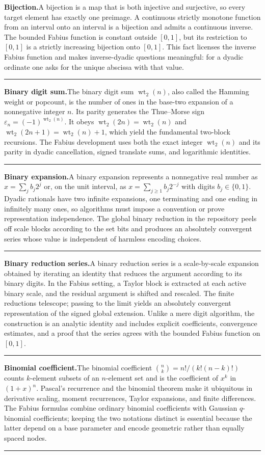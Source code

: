 \documentclass[11pt,oneside]{article}
\newcommand{\wt}{\operatorname{wt}_2}
\newcommand{\glossaryentry}[3]{%
  \par\addvspace{0.95\baselineskip}%
  \phantomsection\hypertarget{gls:#1}{}%
  \noindent\textbf{\large #2.}\enspace #3\par
  \nopagebreak[2]\vspace{0.15\baselineskip}%
  \noindent\color{rulegray}\rule{\linewidth}{0.25pt}\color{black}%
}
\begin{document}
\glossaryentry{bijection}{Bijection}{A bijection is a map that is both injective and surjective, so every target element has exactly one preimage. A continuous strictly monotone function from an interval onto an interval is a bijection and admits a continuous inverse. The bounded Fabius function is constant outside \([0,1]\), but its restriction to \([0,1]\) is a strictly increasing bijection onto \([0,1]\). This fact licenses the inverse Fabius function and makes inverse-dyadic questions meaningful: for a dyadic ordinate one asks for the unique abscissa with that value.}
\glossaryentry{binary-digit-sum}{Binary digit sum}{The binary digit sum \(\wt(n)\), also called the Hamming weight or popcount, is the number of ones in the base-two expansion of a nonnegative integer \(n\). Its parity generates the Thue--Morse sign \(\varepsilon_n=(-1)^{\wt(n)}\). It obeys \(\wt(2n)=\wt(n)\) and \(\wt(2n+1)=\wt(n)+1\), which yield the fundamental two-block recursions. The Fabius development uses both the exact integer \(\wt(n)\) and its parity in dyadic cancellation, signed translate sums, and logarithmic identities.}
\glossaryentry{binary-expansion}{Binary expansion}{A binary expansion represents a nonnegative real number as \(x=\sum_{j}b_j2^j\) or, on the unit interval, as \(x=\sum_{j\ge1}b_j2^{-j}\) with digits \(b_j\in\{0,1\}\). Dyadic rationals have two infinite expansions, one terminating and one ending in infinitely many ones, so algorithms must impose a convention or prove representation independence. The global binary reduction in the repository peels off scale blocks according to the set bits and produces an absolutely convergent series whose value is independent of harmless encoding choices.}
\glossaryentry{binary-reduction-series}{Binary reduction series}{A binary reduction series is a scale-by-scale expansion obtained by iterating an identity that reduces the argument according to its binary digits. In the Fabius setting, a Taylor block is extracted at each active binary scale, and the residual argument is shifted and rescaled. The finite reductions telescope; passing to the limit yields an absolutely convergent representation of the signed global extension. Unlike a mere digit algorithm, the construction is an analytic identity and includes explicit coefficients, convergence estimates, and a proof that the series agrees with the bounded Fabius function on \([0,1]\).}
\glossaryentry{binomial-coefficient}{Binomial coefficient}{The binomial coefficient \(\binom nk=n!/(k!(n-k)!)\) counts \(k\)-element subsets of an \(n\)-element set and is the coefficient of \(x^k\) in \((1+x)^n\). Pascal's recurrence and the binomial theorem make it ubiquitous in derivative scaling, moment recurrences, Taylor expansions, and finite differences. The Fabius formulas combine ordinary binomial coefficients with Gaussian \(q\)-binomial coefficients; keeping the two notations distinct is essential because the latter depend on a base parameter and encode geometric rather than equally spaced nodes.}
\end{document}
